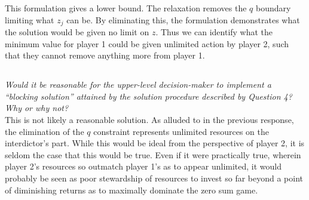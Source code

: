 \documentclass[12pt]{amsart}
\begin{document}
	This formulation gives a lower bound. The relaxation removes the $q$ boundary limiting what $z_j$
	can be. By eliminating this, the formulation demonstrates what the solution would be
	given no limit on $z$. Thus we can identify what the minimum value for player 1 could be
	given unlimited action by player 2, such that they cannot remove anything more from player 1. \\

\subsection{}
\textit{Would it be reasonable for the upper-level decision-maker to implement a “blocking
	solution” attained by the solution procedure described by Question 4? Why or why not?} \\

	This is not likely a reasonable solution. As alluded to in the previous response,
	the elimination of the $q$ constraint represents unlimited resources on the interdictor's part.
	While this would be ideal from the perspective of player 2, it is seldom the case that this would be true.
	Even if it were practically true, wherein player 2's resources so outmatch player 1's as to appear
	unlimited, it would probably be seen as poor stewardship of resources to invest so far beyond a 
	point of diminishing returns as to maximally dominate the zero sum game.
\end{document}
